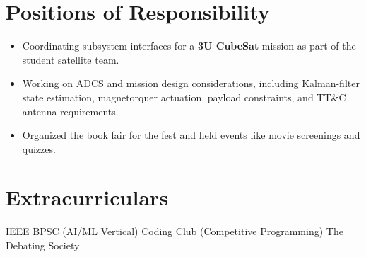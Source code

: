 \documentclass[a4paper, 11px]{article}
\begin{document}
\section{Positions of Responsibility}
\resumeSubHeadingListStart
{}
\begin{itemize}
\item Coordinating subsystem interfaces for a \textbf{3U CubeSat} mission as part of the student satellite team.
\item Working on ADCS and mission design considerations, including Kalman-filter state estimation, magnetorquer actuation, payload constraints, and TT\&C antenna requirements.
\end{itemize}
\begin{itemize}
\item Organized the book fair for the fest and held events like movie screenings and quizzes.
\end{itemize}
\resumeSubHeadingListEnd
\section{Extracurriculars}
\resumeSubHeadingListStart
\item IEEE BPSC (AI/ML Vertical) \quad Coding Club (Competitive Programming) \quad The Debating Society
\resumeSubHeadingListEnd
\end{document}
